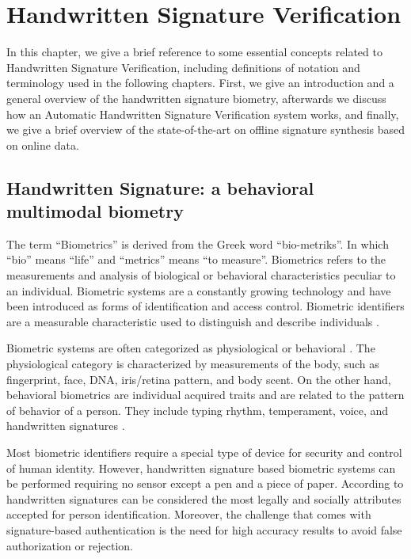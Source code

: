 
\chapter{Handwritten Signature Verification} \label{ch:sig}
In this chapter, we give a brief reference to some essential concepts related to Handwritten Signature Verification, including definitions of notation and terminology used in the following
chapters. First, we give an introduction and a general overview of the handwritten signature
biometry, afterwards we discuss how an Automatic Handwritten Signature Verification system
works, and finally, we give a brief overview of the state-of-the-art on offline signature synthesis
based on online data.

\section{Handwritten Signature: a behavioral multimodal biometry}

The term ``Biometrics'' is derived from the Greek word ``bio-metriks''. In which ``bio'' means ``life'' and ``metrics'' means ``to measure''. Biometrics refers to the measurements and analysis of biological or behavioral characteristics peculiar to an individual. Biometric systems are a constantly growing technology \cite{jain2004biometrics} and have been introduced as forms of identification and access control. Biometric identifiers are a measurable characteristic used to distinguish and describe individuals \cite{jain2000biometric}. 

Biometric systems are often categorized as physiological or behavioral \cite{ross2008introduction}. The physiological category is characterized by measurements of the body, such as fingerprint, face, DNA, iris/retina pattern, and body scent. On the other hand, behavioral biometrics are individual acquired traits and are related to the pattern of behavior of a person. They include typing rhythm, temperament, voice, and handwritten signatures \cite{jain2016}.

Most biometric identifiers require a special type of device for security and control of human identity. However, handwritten signature based biometric systems can be performed requiring no sensor except a pen and a piece of paper. According to \cite{pal2014signature} handwritten signatures can be considered the most legally and socially attributes accepted for person identification. Moreover, the challenge that comes with signature-based authentication is the need for high accuracy results to avoid false authorization or rejection.


